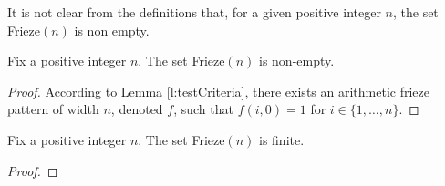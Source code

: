 It is not clear from the definitions that, for a given positive integer $n$, the set Frieze$(n)$ is non empty.
\begin{lemma}
    \label{l:friezeNonEmpty}
    Fix a positive integer $n$. The set Frieze$(n)$ is non-empty.
\end{lemma}
\begin{proof}
    According to Lemma \ref{l:testCriteria}, there exists an arithmetic frieze pattern of width $n$, denoted $f$, such 
    that $f (i,0) = 1$ for $i \in \{1,\ldots , n\}$. 
\end{proof}
\begin{proposition}
    \label{prop:friezeFinite}
    Fix a positive integer $n$. The set Frieze$(n)$ is finite. 
\end{proposition}
\begin{proof}

\end{proof}